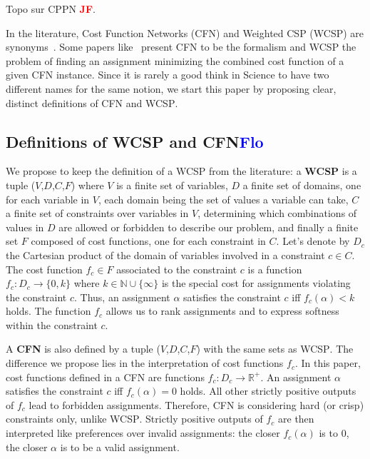 \documentclass{article}
\newcommand{\csp}{\textsc{CSP}\xspace}
\newcommand{\cfn}{\textsc{CFN}\xspace}
\newcommand{\wcsp}{\textsc{WCSP}\xspace}
\newcommand{\flo}{\textcolor{blue}{\bf Flo}\xspace}
\newcommand{\jf}{\textcolor{red}{\bf JF}\xspace}
\begin{document}
Topo sur CPPN \jf \cite{CPPN}.

In the  literature, Cost  Function Networks  (\cfn) and  Weighted \csp
(\wcsp)  are  synonyms~\cite{Zytnicki2009,Bessiere2011}.  Some  papers
like~\cite{Allouche2012} present  \cfn to  be the formalism  and \wcsp
the  problem of  finding an  assignment minimizing  the combined  cost
function of a given \cfn instance. Since  it is rarely a good think in
Science to have two different names for the same notion, we start this
paper by proposing clear, distinct definitions of \cfn and \wcsp.

\subsection{Definitions of \wcsp and \cfn \flo} 

We propose  to keep the definition  of a \wcsp from  the literature: a
\textbf{\wcsp} is a tuple ($V$,$D$,$C$,$F$)  where $V$ is a finite set
of variables,  $D$ a finite set  of domains, one for  each variable in
$V$, each domain  being the set of  values a variable can  take, $C$ a
finite set  of constraints  over variables  in $V$,  determining which
combinations of values in $D$ are allowed or forbidden to describe our
problem, and finally a finite set  $F$ composed of cost functions, one
for  each constraint  in $C$.   Let's  denote by  $D_c$ the  Cartesian
product of  the domain of  variables involved  in a constraint  $c \in
C$. The cost function $f_c \in  F$ associated to the constraint $c$ is
a     function     $f_c:     D_c    \rightarrow     \{0,k\}$     where
$k \in \mathbb{N} \cup \{\infty\}$ is the special cost for assignments
violating the  constraint $c$. Thus, an  assignment $\alpha$ satisfies
the constraint  $c$ iff  $f_c(\alpha) < k$  holds. The  function $f_c$
allows  us to  rank assignments  and  to express  softness within  the
constraint $c$.

A \textbf{\cfn} is also defined  by a tuple ($V$,$D$,$C$,$F$) with the
same  sets  as   \wcsp.   The  difference  we  propose   lies  in  the
interpretation of cost functions $f_c$.  In this paper, cost functions
defined   in   a   \cfn    are   functions   $f_c:   D_c   \rightarrow
\mathbb{R}^+$. An assignment $\alpha$ satisfies the constraint $c$ iff
$f_c(\alpha) = 0$ holds. All  other strictly positive outputs of $f_c$
lead to forbidden assignments. Therefore, \cfn is considering hard (or
crisp) constraints  only, unlike  \wcsp. Strictly positive  outputs of
$f_c$ are then interpreted  like preferences over invalid assignments:
the closer $f_c(\alpha)$ is to 0, the closer $\alpha$ is to be a valid
assignment.
\end{document}
